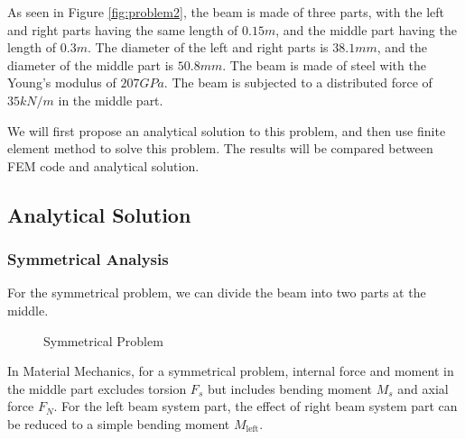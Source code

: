 As seen in Figure \ref{fig:problem2}, the beam is made of three parts, with the left and right parts having the same length of $0.15m$, and the middle part having the length of $0.3m$. The diameter of the left and right parts is $38.1mm$, and the diameter of the middle part is $50.8mm$. The beam is made of steel with the Young's modulus of $207GPa$. The beam is subjected to a distributed force of $35kN/m$ in the middle part.

We will first propose an analytical solution to this problem, and then use finite element method to solve this problem. 
The results will be compared between FEM code and analytical solution.

\subsection{Analytical Solution}

\subsubsection{Symmetrical Analysis}

For the symmetrical problem, 
we can divide the beam into two parts at the middle.
\begin{figure}[H]
    \centering
    \caption{Symmetrical Problem}
\end{figure}

In Material Mechanics, for a symmetrical problem, 
internal force and moment in the middle part excludes torsion $F_s$ but 
includes bending moment $M_s$ and axial force $F_N$.
For the left beam system part, 
the effect of right beam system part can be reduced to 
a simple bending moment $M_{\text{left}}$.

